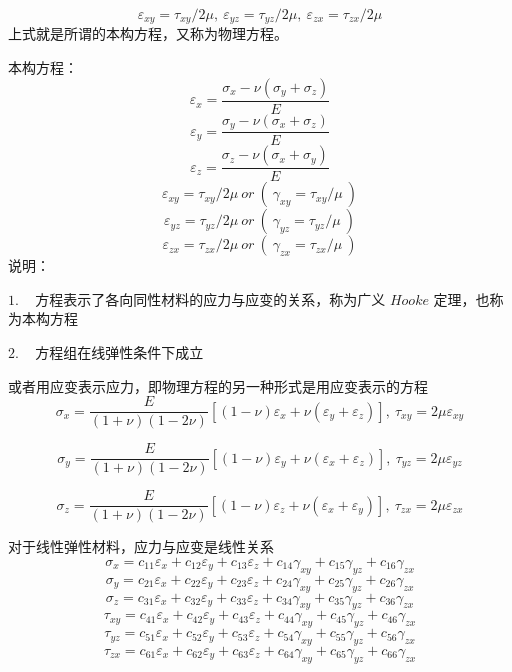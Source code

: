 \documentclass[12pt,a4paper]{article}
\begin{document}
$$
\varepsilon_{xy}=\tau_{xy}/2\mu, ~ \varepsilon_{yz}=\tau_{yz}/2\mu, ~ \varepsilon_{zx}=\tau_{zx}/2\mu
$$
上式就是所谓的本构方程，又称为物理方程。

本构方程：
$$
\varepsilon_x=\frac{\sigma_x-\nu(\sigma_y+\sigma_z)}{E}
$$
$$
\varepsilon_y=\frac{\sigma_y-\nu(\sigma_x+\sigma_z)}{E}
$$
$$
\varepsilon_z=\frac{\sigma_z-\nu(\sigma_x+\sigma_y)}{E}
$$
$$
\varepsilon_{xy}=\tau_{xy}/2\mu ~or~ (~\gamma_{xy}=\tau_{xy}/ \mu~)
$$
$$
\varepsilon_{yz}=\tau_{yz}/2\mu ~or~ (~\gamma_{yz}=\tau_{yz}/ \mu~)
$$
$$
\varepsilon_{zx}=\tau_{zx}/2\mu ~or~ (~\gamma_{zx}=\tau_{zx}/ \mu~)
$$
说明：

$1$. ~ 方程表示了各向同性材料的应力与应变的关系，称为广义 $Hooke$ 定理，也称为本构方程

$2$. ~ 方程组在线弹性条件下成立

或者用应变表示应力，即物理方程的另一种形式是用应变表示的方程
$$
\sigma_x=\frac{E}{(1+\nu)(1-2\nu)}[(1-\nu)\varepsilon_x+\nu(\varepsilon_y+\varepsilon_z)],~ \tau_{xy}=2\mu\varepsilon_{xy}
$$

$$
\sigma_y=\frac{E}{(1+\nu)(1-2\nu)}[(1-\nu)\varepsilon_y+\nu(\varepsilon_x+\varepsilon_z)],~ \tau_{yz}=2\mu\varepsilon_{yz}
$$

$$
\sigma_z=\frac{E}{(1+\nu)(1-2\nu)}[(1-\nu)\varepsilon_z+\nu(\varepsilon_x+\varepsilon_y)],~ \tau_{zx}=2\mu\varepsilon_{zx}
$$

对于线性弹性材料，应力与应变是线性关系
$$
\sigma_x =c_{11}\varepsilon_x+c_{12}\varepsilon_y+c_{13}\varepsilon_z+c_{14}\gamma_{xy}+c_{15}\gamma_{yz}+c_{16}\gamma_{zx}
$$
$$
\sigma_y =c_{21}\varepsilon_x+c_{22}\varepsilon_y+c_{23}\varepsilon_z+c_{24}\gamma_{xy}+c_{25}\gamma_{yz}+c_{26}\gamma_{zx}
$$
$$
\sigma_z =c_{31}\varepsilon_x+c_{32}\varepsilon_y+c_{33}\varepsilon_z+c_{34}\gamma_{xy}+c_{35}\gamma_{yz}+c_{36}\gamma_{zx}
$$
$$
\tau_{xy}=c_{41}\varepsilon_x+c_{42}\varepsilon_y+c_{43}\varepsilon_z+c_{44}\gamma_{xy}+c_{45}\gamma_{yz}+c_{46}\gamma_{zx}
$$
$$
\tau_{yz}=c_{51}\varepsilon_x+c_{52}\varepsilon_y+c_{53}\varepsilon_z+c_{54}\gamma_{xy}+c_{55}\gamma_{yz}+c_{56}\gamma_{zx}
$$
$$
\tau_{zx}=c_{61}\varepsilon_x+c_{62}\varepsilon_y+c_{63}\varepsilon_z+c_{64}\gamma_{xy}+c_{65}\gamma_{yz}+c_{66}\gamma_{zx}
$$
\end{document}
